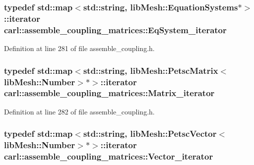 \subsubsection[{Eq\+System\+\_\+iterator}]{\setlength{\rightskip}{0pt plus 5cm}typedef std\+::map$<$std\+::string, lib\+Mesh\+::\+Equation\+Systems$\ast$$>$\+::iterator {\bf carl\+::assemble\+\_\+coupling\+\_\+matrices\+::\+Eq\+System\+\_\+iterator}\hspace{0.3cm}{\ttfamily [protected]}}\label{classcarl_1_1assemble__coupling__matrices_a2c14330f6dd8399037d78458bb27b4f4}


Definition at line 281 of file assemble\+\_\+coupling.\+h.

\hypertarget{classcarl_1_1assemble__coupling__matrices_a14c35d63e9e2980a32a6255ca963ab09}{}
\subsubsection[{Matrix\+\_\+iterator}]{\setlength{\rightskip}{0pt plus 5cm}typedef std\+::map$<$std\+::string, lib\+Mesh\+::\+Petsc\+Matrix$<$lib\+Mesh\+::\+Number$>$$\ast$$>$\+::iterator {\bf carl\+::assemble\+\_\+coupling\+\_\+matrices\+::\+Matrix\+\_\+iterator}\hspace{0.3cm}{\ttfamily [protected]}}\label{classcarl_1_1assemble__coupling__matrices_a14c35d63e9e2980a32a6255ca963ab09}


Definition at line 282 of file assemble\+\_\+coupling.\+h.

\hypertarget{classcarl_1_1assemble__coupling__matrices_a3d5b883bf64512930c7e6efcad06c60d}{}
\subsubsection[{Vector\+\_\+iterator}]{\setlength{\rightskip}{0pt plus 5cm}typedef std\+::map$<$std\+::string, lib\+Mesh\+::\+Petsc\+Vector$<$lib\+Mesh\+::\+Number$>$$\ast$$>$\+::iterator {\bf carl\+::assemble\+\_\+coupling\+\_\+matrices\+::\+Vector\+\_\+iterator}\hspace{0.3cm}{\ttfamily [protected]}}\label{classcarl_1_1assemble__coupling__matrices_a3d5b883bf64512930c7e6efcad06c60d}


